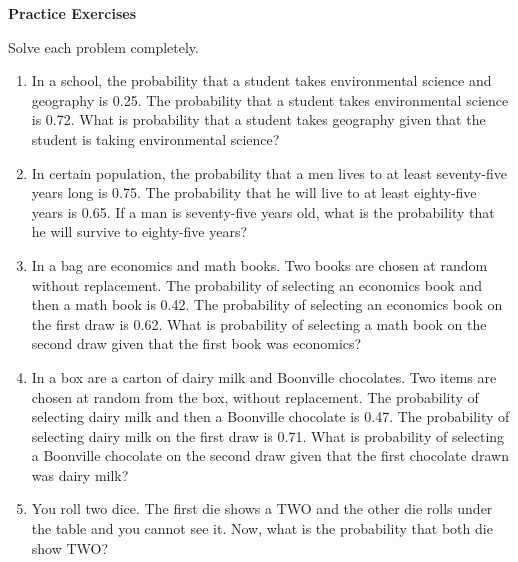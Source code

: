 \textbf{Practice Exercises}

\vspce

Solve each problem completely.
\begin{enumerate}[label = \arabic*. ]
\item In a school, the probability that a student takes environmental science 
and geography is 0.25. The probability that a student takes environmental 
science is 0.72. What is probability that a student takes geography given 
that the student is taking environmental science?
\item In certain population, the probability that a men lives to at least seventy-five years long is 0.75. The probability that he will live to at least eighty-five 
years is 0.65. If a man is seventy-five years old, what is the 
probability that  he will survive to eighty-five years?
\item In a bag are economics and math books. Two books are chosen at 
random without replacement. The probability of selecting an economics book 
and then a math book is 0.42. The probability of selecting an economics 
book on the first draw is 0.62. What is probability of selecting a math book on 
the second draw given that the first book was economics? 
\item In a box are a carton of dairy milk and Boonville chocolates. Two items 
are chosen at random from the box, without replacement. The probability of 
selecting dairy milk and then a Boonville chocolate is 0.47. The probability of 
selecting dairy milk on the first draw is 0.71. What is probability of selecting a 
Boonville chocolate on the second draw given that the first chocolate drawn was dairy milk? 
\item You roll two dice. The first die shows a TWO and the other die rolls under 
the table and you cannot see it. Now, what is the probability that both die 
show TWO?
\end{enumerate} 
